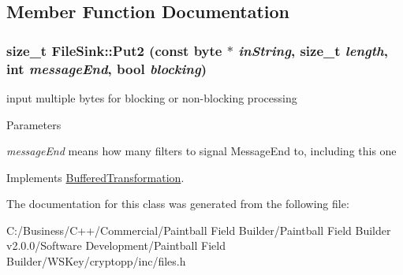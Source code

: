 \subsection{Member Function Documentation}
\hypertarget{class_file_sink_a7d9f9457b3a9d7db252e8ba75487020a}{
\subsubsection[{Put2}]{\setlength{\rightskip}{0pt plus 5cm}size\_\-t FileSink::Put2 (const byte $\ast$ {\em inString}, \/  size\_\-t {\em length}, \/  int {\em messageEnd}, \/  bool {\em blocking})}}
\label{class_file_sink_a7d9f9457b3a9d7db252e8ba75487020a}


input multiple bytes for blocking or non-\/blocking processing 
\begin{DoxyParams}{Parameters}
\item[{\em messageEnd}]means how many filters to signal MessageEnd to, including this one \end{DoxyParams}


Implements \hyperlink{class_buffered_transformation_ad396dcb42260f23125a35ec0e5d17d55}{BufferedTransformation}.

The documentation for this class was generated from the following file:\begin{DoxyCompactItemize}
\item 
C:/Business/C++/Commercial/Paintball Field Builder/Paintball Field Builder v2.0.0/Software Development/Paintball Field Builder/WSKey/cryptopp/inc/files.h\end{DoxyCompactItemize}
